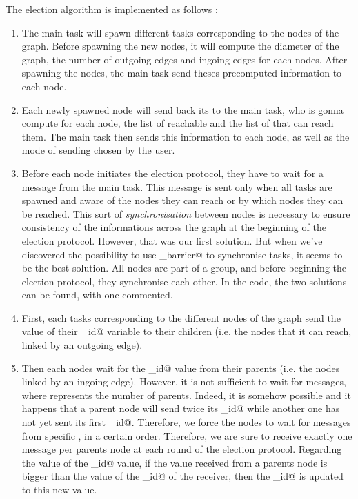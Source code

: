 \documentclass{article}
\begin{document}
The election algorithm is implemented as follows : 
\begin{enumerate}
\item The main task will spawn different \verb@pvm@ tasks corresponding to the nodes of the graph. Before spawning the new nodes, it will compute the diameter of the graph, the number of outgoing edges and ingoing edges for each nodes. After spawning the nodes, the main task send theses precomputed information to each node.
\item Each newly spawned node will send back its \verb@tid@ to the main task, who is gonna compute for each node, the list of reachable \verb@tids@ and the list of \verb@tids@ that can reach them. The main task then sends this information to each node, as well as the mode of sending chosen by the user.
\item Before each node initiates the election protocol, they have to wait for a \verb@start@ message from the main task. This message is sent only when all tasks are spawned and aware of the nodes they can reach or by which nodes they can be reached. This sort of \textit{synchronisation} between nodes is necessary to ensure consistency of the informations across the graph at the beginning of the election protocol. However, that was our first solution. But when we've discovered the possibility to use \verb@pvm_barrier@ to synchronise tasks, it seems to be the best solution. All nodes are part of a group, and before beginning the election protocol, they synchronise each other. In the code, the two solutions can be found, with one commented.
\item First, each \verb@pvm@ tasks corresponding to the different nodes of the graph send the value of their \verb@max_id@ variable to their children (i.e. the nodes that it can reach, linked by an outgoing edge).
\item Then each nodes wait for the \verb@max_id@ value from their parents (i.e. the nodes linked by an ingoing edge). However, it is not sufficient to wait for \verb@n@ messages, where \verb@n@ represents the number of parents. Indeed, it is somehow possible and it happens that a parent node will send twice its \verb@max_id@ while another one has not yet sent its first \verb@max_id@. Therefore, we force the nodes to wait for messages from specific \verb@tid@, in a certain order. Therefore, we are sure to receive exactly one message per parents node at each round of the election protocol. Regarding the value of the \verb@max_id@ value, if the value received from a parents node is bigger than the value of the \verb@max_id@ of the receiver, then the \verb@max_id@ is updated to this new value.

\end{enumerate}
\end{document}
